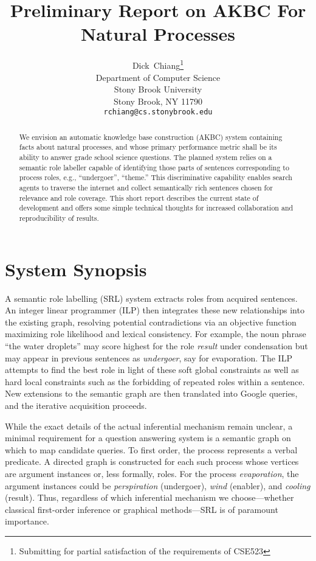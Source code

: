 \documentclass{article} %
\title{Preliminary Report on AKBC For Natural Processes}
\author{
Dick~Chiang\thanks{Submitting for partial satisfaction of the requirements of CSE523}\\
Department of Computer Science\\
Stony Brook University\\
Stony Brook, NY 11790 \\
\texttt{rchiang@cs.stonybrook.edu} \\
}
\begin{document}
\maketitle

\begin{abstract}
We envision an automatic knowledge base construction (AKBC) system containing facts about natural processes, and whose primary performance metric shall be its ability to answer grade school science questions.  The planned system relies on a semantic role labeller capable of identifying those parts of sentences corresponding to process roles, e.g., ``undergoer'', ``theme.''  This discriminative capability enables search agents to traverse the internet and collect semantically rich sentences chosen for relevance and role coverage.  This short report describes the current state of development and offers some simple technical thoughts for increased collaboration and reproducibility of results.
\end{abstract}

\section{System Synopsis}
A semantic role labelling (SRL) system extracts roles from acquired sentences.  An integer linear programmer (ILP) then integrates these new relationships into the existing graph, resolving potential contradictions via an objective function maximizing role likelihood and lexical consistency.  For example, the noun phrase ``the water droplets'' may score highest for the role {\it result} under condensation but may appear in previous sentences as {\it undergoer}, say for evaporation.   The ILP attempts to find the best role in light of these soft global constraints as well as hard local constraints such as the forbidding of repeated roles within a sentence.  New extensions to the semantic graph are then translated into Google queries, and the iterative acquisition proceeds.

While the exact details of the actual inferential mechanism remain unclear, a minimal requirement for a question answering system is a semantic graph on which to map candidate queries.  To first order, the process represents a verbal predicate.  A directed graph is constructed for each such process whose vertices are argument instances or, less formally, roles.  For the process {\it evaporation}, the argument instances could be {\it perspiration} (undergoer), {\it wind} (enabler), and {\it cooling} (result).  Thus, regardless of which inferential mechanism we choose---whether classical first-order inference or graphical methods---SRL is of paramount importance.
\end{document}
